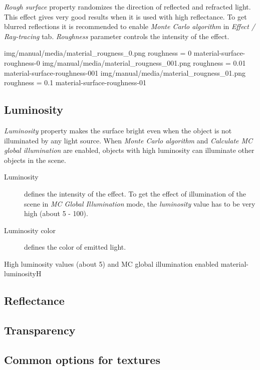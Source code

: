 \emph{Rough surface} property randomizes the direction of reflected and refracted light. This effect gives very good results when it is used with high reflectance. To get blurred reflections it is recommended to enable \emph{Monte Carlo algorithm} in \emph{Effect / Ray-tracing} tab. \emph{Roughness} parameter controls the intensity of the effect.

\threeImagesWithTwoCaptionsFullWidth
{img/manual/media/material_rougness_0.png}
{roughness = 0}
{material-surface-roughness-0}
{img/manual/media/material_rougness_001.png}
{roughness = 0.01}
{material-surface-roughness-001}
{img/manual/media/material_rougness_01.png}
{roughness = 0.1}
{material-surface-roughness-01}

\subsection{Luminosity}\label{materials-luminosity}

\emph{Luminosity} property makes the surface bright even when the object is not illuminated by any light source. When \emph{Monte Carlo algorithm} and \emph{Calculate MC global illumination} are enabled, objects with high luminosity can illuminate other objects in the scene. 

\begin{description}
	\item[Luminosity] defines the intensity of the effect. To get the effect of illumination of the scene in\emph{ MC Global Illumination} mode, the \emph{luminosity} value has to be very high (about 5 - 100). 
	\item[Luminosity color] defines the color of emitted light.
\end{description}

{High luminosity values (about 5) and MC global illumination enabled}
{material-luminosity}{H}

\subsection{Reflectance}\label{materials-reflectance}

\subsection{Transparency}\label{materials-transparency}

\subsection{Common options for textures}\label{materials-textures}

